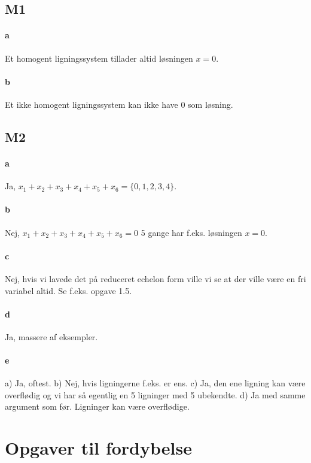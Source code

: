 		\subsection{M1}

			\paragraph{a} Et homogent ligningssystem tillader altid løsningen $x=0$.

			\paragraph{b} Et ikke homogent ligningssystem kan ikke have 0 som løsning.

		\subsection{M2}

			\paragraph{a} Ja, $x_1+x_2+x_3+x_4+x_5+x_6=\{0,1,2,3,4\}$.

			\paragraph{b} Nej, $x_1+x_2+x_3+x_4+x_5+x_6=0$ 5 gange har f.eks. løsningen $x=0$.

			\paragraph{c} Nej, hvis vi lavede det på reduceret echelon form ville vi se at der ville være en fri variabel altid. Se f.eks. opgave 1.5.

			\paragraph{d} Ja, massere af eksempler.

			\paragraph{e} a) Ja, oftest. b) Nej, hvis ligningerne f.eks. er ens. c) Ja, den ene ligning kan være overflødig og vi har så egentlig en 5 ligninger med 5 ubekendte. d) Ja med samme argument som før. Ligninger kan være overflødige. 

	\section{Opgaver til fordybelse}

